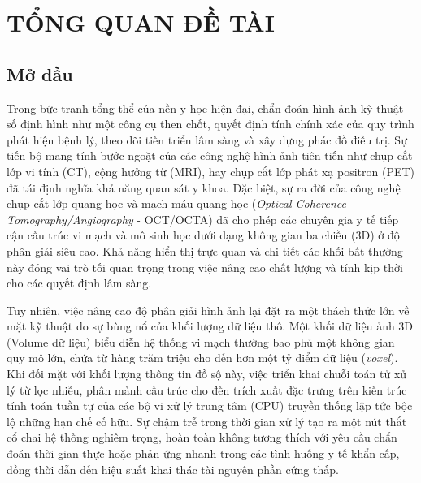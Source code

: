 
\chapter{TỔNG QUAN ĐỀ TÀI}

\label{Chapter1}


\newcommand{\keyword}[1]{\textbf{#1}}
\newcommand{\tabhead}[1]{\textbf{#1}}
\newcommand{\code}[1]{\texttt{#1}}
\newcommand{\file}[1]{\texttt{\bfseries#1}}
\newcommand{\option}[1]{\texttt{\itshape#1}}


\section{Mở đầu}

Trong bức tranh tổng thể của nền y học hiện đại, chẩn đoán hình ảnh kỹ thuật số định hình như một công cụ then chốt, quyết định tính chính xác của quy trình phát hiện bệnh lý, theo dõi tiến triển lâm sàng và xây dựng phác đồ điều trị. Sự tiến bộ mang tính bước ngoặt của các công nghệ hình ảnh tiên tiến như chụp cắt lớp vi tính (CT), cộng hưởng từ (MRI), hay chụp cắt lớp phát xạ positron (PET) đã tái định nghĩa khả năng quan sát y khoa. Đặc biệt, sự ra đời của công nghệ chụp cắt lớp quang học và mạch máu quang học (\textit{Optical Coherence Tomography/Angiography} - OCT/OCTA) đã cho phép các chuyên gia y tế tiếp cận cấu trúc vi mạch và mô sinh học dưới dạng không gian ba chiều (3D) ở độ phân giải siêu cao. Khả năng hiển thị trực quan và chi tiết các khối bất thường này đóng vai trò tối quan trọng trong việc nâng cao chất lượng và tính kịp thời cho các quyết định lâm sàng.

Tuy nhiên, việc nâng cao độ phân giải hình ảnh lại đặt ra một thách thức lớn về mặt kỹ thuật do sự bùng nổ của khối lượng dữ liệu thô. Một khối dữ liệu ảnh 3D (Volume dữ liệu) biểu diễn hệ thống vi mạch thường bao phủ một không gian quy mô lớn, chứa từ hàng trăm triệu cho đến hơn một tỷ điểm dữ liệu (\textit{voxel}). Khi đối mặt với khối lượng thông tin đồ sộ này, việc triển khai chuỗi toán tử xử lý từ lọc nhiễu, phân mảnh cấu trúc cho đến trích xuất đặc trưng trên kiến trúc tính toán tuần tự của các bộ vi xử lý trung tâm (CPU) truyền thống lập tức bộc lộ những hạn chế cố hữu. Sự chậm trễ trong thời gian xử lý tạo ra một nút thắt cổ chai hệ thống nghiêm trọng, hoàn toàn không tương thích với yêu cầu chẩn đoán thời gian thực hoặc phản ứng nhanh trong các tình huống y tế khẩn cấp, đồng thời dẫn đến hiệu suất khai thác tài nguyên phần cứng thấp.

